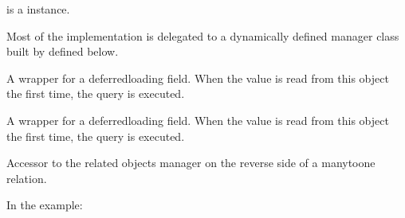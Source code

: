 \documentclass[letterpaper,10pt,french]{sphinxmanual}
\begin{document}
\begin{fulllineitems}
\begin{fulllineitems}
\sphinxAtStartPar
{} is a  instance.

\sphinxAtStartPar
Most of the implementation is delegated to a dynamically defined manager
class built by  defined below.

\end{fulllineitems}


\begin{fulllineitems}
\label{\detokenize{main/model:main.models.Enseignant.specialite}}
\pysigstartsignatures
{}
\pysigstopsignatures
\sphinxAtStartPar
A wrapper for a deferred\sphinxhyphen{}loading field. When the value is read from this
object the first time, the query is executed.

\end{fulllineitems}


\begin{fulllineitems}
\label{\detokenize{main/model:main.models.Enseignant.type}}
\pysigstartsignatures
{}
\pysigstopsignatures
\sphinxAtStartPar
A wrapper for a deferred\sphinxhyphen{}loading field. When the value is read from this
object the first time, the query is executed.

\end{fulllineitems}


\begin{fulllineitems}
\label{\detokenize{main/model:main.models.Enseignant.ue_set}}
\pysigstartsignatures
{}
\pysigstopsignatures
\sphinxAtStartPar
Accessor to the related objects manager on the reverse side of a
many\sphinxhyphen{}to\sphinxhyphen{}one relation.

\sphinxAtStartPar
In the example:

\begin{sphinxVerbatim}[commandchars=\\\{\}]
 
       
\end{sphinxVerbatim}


\end{fulllineitems}
\end{fulllineitems}
\end{document}
